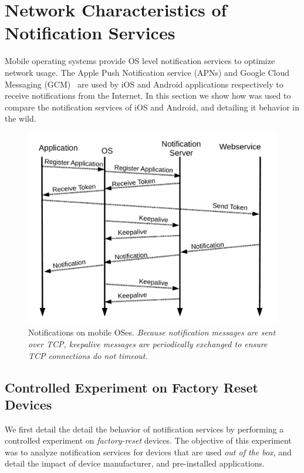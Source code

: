 \section{Network Characteristics of Notification Services}
\label{sec:characterize-os}

Mobile operating systems provide OS level notification services to optimize network usage.
The Apple Push Notification service (APNs) and Google Cloud Messaging (GCM)~\cite{gcm} are used by iOS and Android applications respectively to receive notifications from the Internet.
In this section we show how \platname was used to compare the notification services of iOS and Android, and detailing it behavior in the wild. 

\begin{figure}
\centering
\includegraphics[width=\columnwidth]{figures/Notification.pdf}
\caption{Notifications on mobile OSes. \emph{Because notification messages are sent over TCP, keepalive messages are periodically exchanged to ensure TCP connections do not timeout.}}
\label{fig:push-expt-interarrival}
\end{figure}



\subsection{Controlled Experiment on Factory Reset Devices}

We first detail the detail the behavior of notification services by performing a controlled experiment on \emph{factory-reset} devices. 
The objective of this experiment was to analyze notification services for devices that are used \emph{out of the box}, and detail the impact of device manufacturer, and pre-installed applications. 


